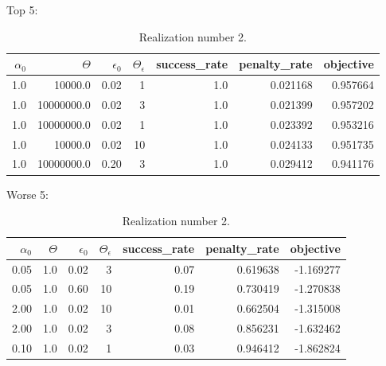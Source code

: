 \documentclass[conference]{IEEEtran}
\begin{document}
\begin{table}
\scriptsize
Top 5: \newline
\begin{tabular}{rrrrrrr}
\hline
$\alpha_0$ &    $\Theta$ &  $\epsilon_0$ &  $\Theta_\epsilon$ &  success\_rate &  penalty\_rate &  objective \\
\hline
     1.0 &     10000.0 &       0.02 &                  1 &           1.0 &      0.021168 &   0.957664 \\
     1.0 &  10000000.0 &       0.02 &                  3 &           1.0 &      0.021399 &   0.957202 \\
     1.0 &  10000000.0 &       0.02 &                  1 &           1.0 &      0.023392 &   0.953216 \\
     1.0 &     10000.0 &       0.02 &                 10 &           1.0 &      0.024133 &   0.951735 \\
     1.0 &  10000000.0 &       0.20 &                  3 &           1.0 &      0.029412 &   0.941176 \\
\hline
\end{tabular}

\vspace{1em} Worse 5: \newline
\begin{tabular}{rrrrrrr}
\hline
$\alpha_0$ &    $\Theta$ &  $\epsilon_0$ &  $\Theta_\epsilon$ &  success\_rate &  penalty\_rate &  objective \\
\hline
    0.05 &    1.0 &       0.02 &                  3 &          0.07 &      0.619638 &  -1.169277 \\
    0.05 &    1.0 &       0.60 &                 10 &          0.19 &      0.730419 &  -1.270838 \\
    2.00 &    1.0 &       0.02 &                 10 &          0.01 &      0.662504 &  -1.315008 \\
    2.00 &    1.0 &       0.02 &                  3 &          0.08 &      0.856231 &  -1.632462 \\
    0.10 &    1.0 &       0.02 &                  1 &          0.03 &      0.946412 &  -1.862824 \\
\hline
\end{tabular}

\vspace{2em}
\caption{Realization number 2.}
\label{tab:02}
\end{table}
\end{document}
